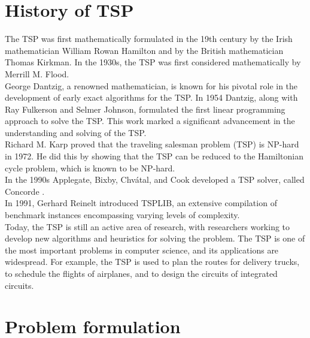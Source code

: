 \section{History of TSP}
The TSP was first mathematically formulated in the 19th century by the Irish mathematician William Rowan Hamilton and by the British mathematician Thomas Kirkman. In the 1930s, the TSP was first considered mathematically by Merrill M. Flood.\\
George Dantzig, a renowned mathematician, is known for his pivotal role in the development of early exact algorithms for the TSP. In 1954 Dantzig, along with Ray Fulkerson and Selmer Johnson, formulated the first linear programming approach to solve the TSP. This work marked a significant advancement in the understanding and solving of the TSP.\\
Richard M. Karp proved that the traveling salesman problem (TSP) is NP-hard in 1972. He did this by showing that the TSP can be reduced to the Hamiltonian cycle problem, which is known to be NP-hard.\\
In the 1990s  Applegate, Bixby, Chvátal, and Cook developed a TSP solver, called Concorde \cite{Concorde}. \\
In 1991, Gerhard Reinelt introduced TSPLIB\cite{TSPLIB}, an extensive compilation of benchmark instances encompassing varying levels of complexity.\\
Today, the TSP is still an active area of research, with researchers working to develop new algorithms and heuristics for solving the problem. The TSP is one of the most important problems in computer science, and its applications are widespread. For example, the TSP is used to plan the routes for delivery trucks, to schedule the flights of airplanes, and to design the circuits of integrated circuits.


\section{Problem formulation}

